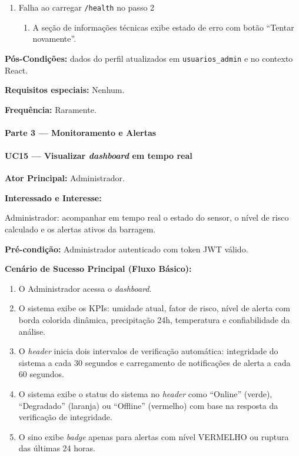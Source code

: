 \begin{enumerate}
  \renewcommand{\theenumi}{2b}
  \renewcommand{\labelenumi}{\theenumi.}
  \item Falha ao carregar \texttt{/health} no passo 2
  \begin{enumerate}
  \item A seção de informações técnicas exibe estado
        de erro com botão ``Tentar novamente''.
  \end{enumerate}
\end{enumerate}

\textbf{Pós-Condições:} dados do perfil atualizados em
\texttt{usuarios\_admin} e no contexto React.

\textbf{Requisitos especiais:} Nenhum.

\textbf{Frequência:} Raramente.

\paragraph{Parte 3 --- Monitoramento e Alertas}\hfill\break

\paragraph{UC15 --- Visualizar \textit{dashboard} em tempo real}\hfill\break

\textbf{Ator Principal:} Administrador.

\textbf{Interessado e Interesse:}

Administrador: acompanhar em tempo real o estado do sensor,
o nível de risco calculado e os alertas ativos da barragem.

\textbf{Pré-condição:} Administrador autenticado com token
JWT válido.

\textbf{Cenário de Sucesso Principal (Fluxo Básico):}
\begin{enumerate}
  \item O Administrador acessa o \textit{dashboard}.
  \item O sistema exibe os KPIs: umidade atual, fator de
        risco, nível de alerta com borda colorida dinâmica,
        precipitação 24h, temperatura e confiabilidade
        da análise.
  \item O \textit{header} inicia dois intervalos de
        verificação automática: integridade do sistema a
        cada 30 segundos e carregamento de notificações
        de alerta a cada 60 segundos.
  \item O sistema exibe o status do sistema no
        \textit{header} como ``Online'' (verde),
        ``Degradado'' (laranja) ou ``Offline''
        (vermelho) com base na resposta da verificação
        de integridade.
  \item O sino exibe \textit{badge} apenas para alertas
        com nível VERMELHO ou ruptura das últimas
        24 horas.
\end{enumerate}


